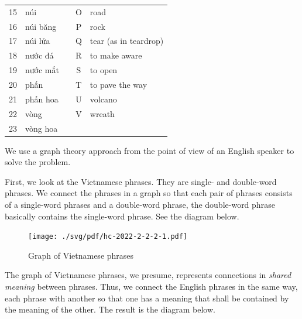\begin{multicols}{2}
\begin{example*}
\begin{otherlanguage}{vietnamese}
\begin{center}
\begin{tabular}{|c|l|c|c|l|}
					15 & núi        &  & O & road                                \\ \cline{1-2} \cline{4-5} 
					16 & núi băng   &  & P & rock                                \\ \cline{1-2} \cline{4-5} 
					17 & núi lửa    &  & Q & tear (as in teardrop)               \\ \cline{1-2} \cline{4-5} 
					18 & nước đá    &  & R & to make aware                       \\ \cline{1-2} \cline{4-5} 
					19 & nước mắt   &  & S & to open                             \\ \cline{1-2} \cline{4-5} 
					20 & phấn       &  & T & to pave the way                     \\ \cline{1-2} \cline{4-5} 
					21 & phấn hoa   &  & U & volcano                             \\ \cline{1-2} \cline{4-5} 
					22 & vòng       &  & V & wreath                              \\ \cline{1-2} \cline{4-5} 
					23 & vòng hoa   &  &   &                                     \\ \cline{1-2} \cline{4-5} 
				\end{tabular}
			\end{center}
			
		\end{otherlanguage}
		
	\end{example*}
	
	\newpage
	
	\begin{soln}
		We use a graph theory approach from the point of view of an English speaker to solve the problem.
		
		First, we look at the Vietnamese phrases. They are single- and double-word phrases.
		We connect the phrases in a graph so that each pair of phrases consists of a single-word phrases and a double-word phrase,
		the double-word phrase basically contains the single-word phrase. See the diagram below.
		
		\begin{figure}[h]
			\centering
			\begin{minipage}[t]{9cm}
				\centering
				\texttt{[image: ./svg/pdf/hc-2022-2-2-2-1.pdf]}
				\caption{Graph of Vietnamese phrases}
			\end{minipage}
		\end{figure}
		
		The graph of Vietnamese phrases, we presume, represents connections in \textit{shared meaning} between phrases.
		Thus, we connect the English phrases in the same way,
		each phrase with another so that one has a meaning that shall be contained by the meaning of the other.
		The result is the diagram below.
		

\end{soln}
\end{multicols}

